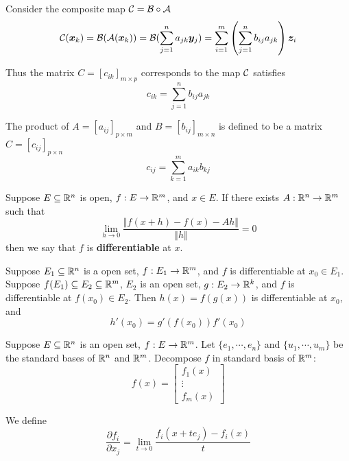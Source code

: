         Consider the composite map $\mathcal{C} = \mathcal{B} \circ \mathcal{A}$
        \begin{equation}
            \mathcal{C}(\boldsymbol{x}_k) = \mathcal{B}(\mathcal{A}(\boldsymbol{x}_k)) = \mathcal{B}(\sum_{j=1}^n a_{jk}\boldsymbol{y}_j) = \sum_{i=1}^m \left(\sum_{j=1}^n b_{ij}a_{jk} \right) \boldsymbol{z}_i
        \end{equation}

        Thus the matrix $C = [c_{ik}]_{m \times p}$ corresponds to the map $\mathcal{C}$ satisfies
        \begin{equation}
            c_{ik} = \sum_{j=1}^n b_{ij}a_{jk}
        \end{equation}

    \begin{defi}
        The product of $A = [a_{ij}]_{p \times m}$ and $B = [b_{ij}]_{m \times n}$ is defined to be a matrix $C = [c_{ij}]_{p \times n}$
        \begin{equation}
            c_{ij} = \sum_{k=1}^m a_{ik}b_{kj}
        \end{equation}
    \end{defi}

    \begin{defi}
        Suppose $E \subseteq \mathbb{R}^n$ is open, $f: E \to \mathbb{R}^m$, and $x \in E$. If there exists $A : \mathbb{R}^n \to \mathbb{R}^m$ such that
        \begin{equation}
            \lim_{h \to 0} \frac{\Vert f(x+h)-f(x)-Ah \Vert}{\Vert h \Vert} = 0
        \end{equation}
        then we say that $f$ is \textbf{differentiable} at $x$.
    \end{defi}

    \begin{theo}
        Suppose $E_1 \subseteq \mathbb{R}^n$ is a open set, $f : E_1 \to \mathbb{R}^m$, and $f$ is differentiable at $x_0 \in E_1$. Suppose $f(E_1) \subseteq E_2 \subseteq \mathbb{R}^m$, $E_2$ is an open set, $g : E_2 \to \mathbb{R}^k$, and $f$ is differentiable at $f(x_0) \in E_2$. Then $h(x) = f(g(x))$ is differentiable at $x_0$, and
        \begin{equation}
            h'(x_0) = g'(f(x_0)) f'(x_0)
        \end{equation}
    \end{theo}

    \begin{defi}
        Suppose $E \subseteq \mathbb{R}^n$ is an open set, $f: E \to \mathbb{R}^m$. Let $\{e_1, \cdots, e_n\}$ and $\{u_1, \cdots, u_m\}$ be the standard bases of $\mathbb{R}^n$ and $\mathbb{R}^m$. Decompose $f$ in standard basis of $\mathbb{R}^m$:
        \begin{equation}
            f(x) = \begin{bmatrix}
                f_1(x) \\ \vdots \\ f_m(x)
            \end{bmatrix}
        \end{equation}

        We define
        \begin{equation}
            \frac{\partial f_i}{\partial x_j} = \lim_{t \to 0} \frac{f_i(x + te_j)-f_i(x)}{t}
        \end{equation}
    \end{defi}


